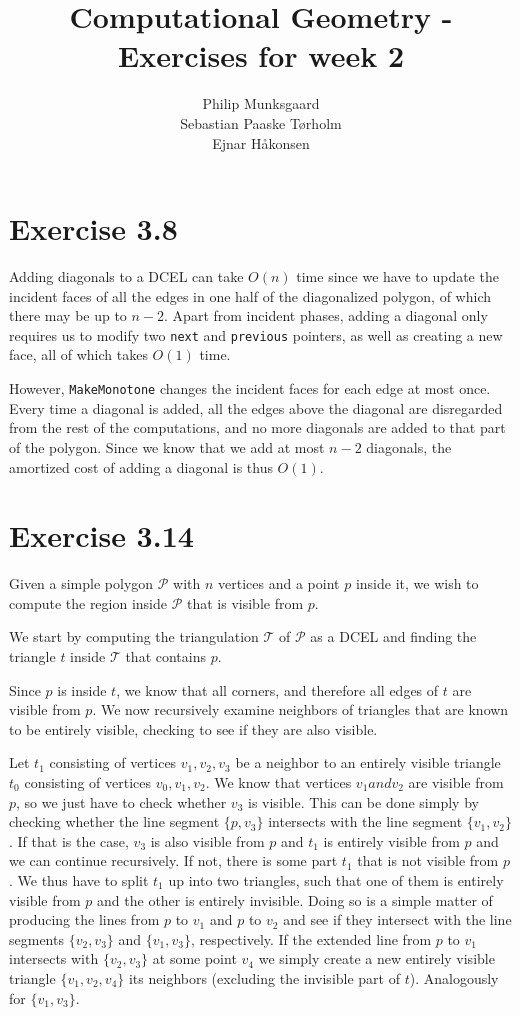 \documentclass[11pt,a4paper]{article}
\title{Computational Geometry - Exercises for week 2}
\author{Philip Munksgaard\\Sebastian Paaske Tørholm \\ Ejnar Håkonsen}
\begin{document}
\maketitle

\section{Exercise 3.8}

Adding diagonals to a DCEL can take $O(n)$ time since we have to
update the incident faces of all the edges in one half of the
diagonalized polygon, of which there may be up to $n-2$. Apart from
incident phases, adding a diagonal only requires us to modify two
\texttt{next} and \texttt{previous} pointers, as well as creating a
new face, all of which takes $O(1)$ time.

However, \texttt{MakeMonotone} changes the incident faces for each
edge at most once. Every time a diagonal is added, all the edges above
the diagonal are disregarded from the rest of the computations, and no
more diagonals are added to that part of the polygon. Since we know
that we add at most $n-2$ diagonals, the amortized cost of adding a
diagonal is thus $O(1)$.

\section{Exercise 3.14}

Given a simple polygon $\mathcal{P}$ with $n$ vertices and a point $p$
inside it, we wish to compute the region inside $\mathcal{P}$ that is
visible from $p$.

We start by computing the triangulation $\mathcal{T}$ of $\mathcal{P}$
as a DCEL and finding the triangle $t$ inside $\mathcal{T}$ that contains
$p$.

Since $p$ is inside $t$, we know that all corners, and therefore all
edges of $t$ are visible from $p$. We now recursively examine
neighbors of triangles that are known to be entirely visible, checking
to see if they are also visible.

Let $t_1$ consisting of vertices $v_1, v_2, v_3$ be a neighbor to an
entirely visible triangle $t_0$ consisting of vertices $v_0, v_1,
v_2$. We know that vertices $v_1 and v_2$ are visible from $p$, so we
just have to check whether $v_3$ is visible. This can be done simply
by checking whether the line segment $\{p, v_3\}$ intersects with the
line segment $\{v_1, v_2\}$. If that is the case, $v_3$ is also
visible from $p$ and $t_1$ is entirely visible from $p$ and we can
continue recursively. If not, there is some part $t_1$ that is not
visible from $p$. We thus have to split $t_1$ up into two triangles,
such that one of them is entirely visible from $p$ and the other is
entirely invisible. Doing so is a simple matter of producing the lines
from $p$ to $v_1$ and $p$ to $v_2$ and see if they intersect with the
line segments $\{v_2, v_3\}$ and $\{v_1, v_3\}$, respectively. If the
extended line from $p$ to $v_1$ intersects with $\{v_2, v_3\}$ at some
point $v_4$ we simply create a new entirely visible triangle $\{v_1,
v_2, v_4\}$ its neighbors (excluding the invisible part of
$t$). Analogously for $\{v_1, v_3\}$.
\end{document}
